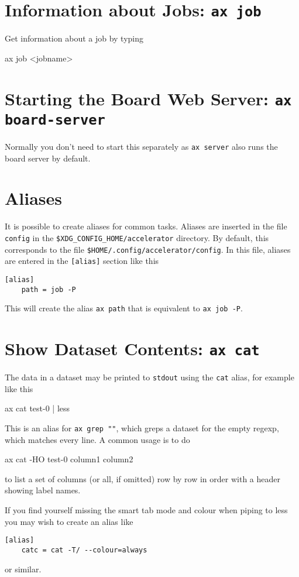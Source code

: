 \section{Information about Jobs: \texttt{ax job}}
Get information about a job by typing
\begin{shell}
ax job <jobname>
\end{shell}


\section{Starting the Board Web Server: \texttt{ax board-server}}

Normally you don't need to start this separately as \texttt{ax server}
also runs the board server by default.


\section{Aliases}
It is possible to create aliases for common tasks.  Aliases are
inserted in the file \texttt{config} in the
\texttt{\$XDG\_CONFIG\_HOME/accelerator} directory.  By default, this
corresponds to the file \texttt{\$HOME/.config/accelerator/config}.
In this file, aliases are entered in the \texttt{[alias]} section like this
\begin{verbatim}
[alias]
    path = job -P
\end{verbatim}
This will create the alias \texttt{ax path} that is equivalent to
\texttt{ax job -P}.



\section{Show Dataset Contents: \texttt{ax cat}}
The data in a dataset may be printed to \texttt{stdout} using the
\texttt{cat} alias, for example like this
\begin{shell}
ax cat test-0 | less
\end{shell}
This is an alias for \texttt{ax grep ""}, which greps a dataset for the
empty regexp, which matches every line.
A common usage is to do

\begin{shell}
ax cat -HO test-0 column1 column2
\end{shell}
to list a set of columns (or all, if omitted) row by row in order with
a header showing label names.

If you find yourself missing the smart tab mode and colour when piping to
less you may wish to create an alias like
\begin{verbatim}
[alias]
    catc = cat -T/ --colour=always
\end{verbatim}
or similar.


